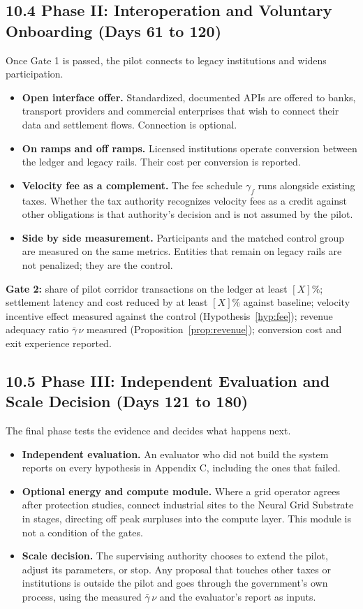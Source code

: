\documentclass[11pt,a4paper]{article}
\theoremstyle{definition}
\theoremstyle{plain}
\theoremstyle{remark}
\begin{document}
\subsection*{10.4 Phase II: Interoperation and Voluntary Onboarding (Days 61 to 120)}
Once Gate 1 is passed, the pilot connects to legacy institutions and widens participation.
\begin{itemize}
\item \textbf{Open interface offer.} Standardized, documented APIs are offered to banks, transport providers and commercial enterprises that wish to connect their data and settlement flows. Connection is optional.
\item \textbf{On ramps and off ramps.} Licensed institutions operate conversion between the ledger and legacy rails. Their cost per conversion is reported.
\item \textbf{Velocity fee as a complement.} The fee schedule $\gamma_f$ runs alongside existing taxes. Whether the tax authority recognizes velocity fees as a credit against other obligations is that authority's decision and is not assumed by the pilot.
\item \textbf{Side by side measurement.} Participants and the matched control group are measured on the same metrics. Entities that remain on legacy rails are not penalized; they are the control.
\end{itemize}
\textbf{Gate 2:} share of pilot corridor transactions on the ledger at least $[X]\%$; settlement latency and cost reduced by at least $[X]\%$ against baseline; velocity incentive effect measured against the control (Hypothesis~\ref{hyp:fee}); revenue adequacy ratio $\bar\gamma\,\nu$ measured (Proposition~\ref{prop:revenue}); conversion cost and exit experience reported.

\subsection*{10.5 Phase III: Independent Evaluation and Scale Decision (Days 121 to 180)}
The final phase tests the evidence and decides what happens next.
\begin{itemize}
\item \textbf{Independent evaluation.} An evaluator who did not build the system reports on every hypothesis in Appendix C, including the ones that failed.
\item \textbf{Optional energy and compute module.} Where a grid operator agrees after protection studies, connect industrial sites to the Neural Grid Substrate in stages, directing off peak surpluses into the compute layer. This module is not a condition of the gates.
\item \textbf{Scale decision.} The supervising authority chooses to extend the pilot, adjust its parameters, or stop. Any proposal that touches other taxes or institutions is outside the pilot and goes through the government's own process, using the measured $\bar\gamma\,\nu$ and the evaluator's report as inputs.
\end{itemize}
\end{document}

